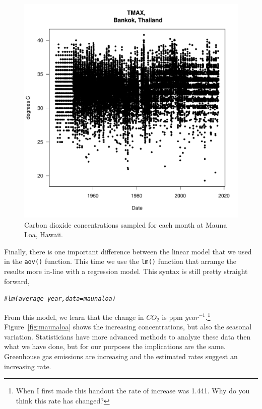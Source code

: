 \documentclass{article}\usepackage[]{graphicx}\usepackage[]{color}
\makeatletter
\def\maxwidth{ %
  \ifdim\Gin@nat@width>\linewidth
    \linewidth
  \else
    \Gin@nat@width
  \fi
}
\newcommand{\hlcom}[1]{\textcolor[rgb]{0.678,0.584,0.686}{\textit{#1}}}%
\newenvironment{kframe}{%
 \def\at@end@of@kframe{}%
 \ifinner\ifhmode%
  \def\at@end@of@kframe{\end{minipage}}%
  \begin{minipage}{\columnwidth}%
 \fi\fi%
 \def\FrameCommand##1{\hskip\@totalleftmargin \hskip-\fboxsep
 \colorbox{shadecolor}{##1}\hskip-\fboxsep
     \hskip-\linewidth \hskip-\@totalleftmargin \hskip\columnwidth}%
 \MakeFramed {\advance\hsize-\width
   \@totalleftmargin\z@ \linewidth\hsize
   \@setminipage}}%
 {\par\unskip\endMakeFramed%
 \at@end@of@kframe}
\newenvironment{knitrout}{}{} %
\makeatother
\begin{document}
\begin{figure}
\label{fig:test12}
\caption{Carbon dioxide concentrations sampled for each month at Mauna Loa, Hawaii.}
\begin{knitrout}
\color{fgcolor}
\includegraphics[width=\maxwidth]{figure/unnamed-chunk-15-1} 

\end{knitrout}
\end{figure}


Finally, there is one important difference between the linear model that we used in the \texttt{aov()} function. This time we use the \texttt{lm()} function that arrange the results more in-line with a regression model.
This syntax is still pretty straight forward,  

\begin{knitrout}
\color{fgcolor}\begin{kframe}
\begin{alltt}
\hlcom{#lm(average ~ year, data=maunaloa)}
\end{alltt}
\end{kframe}
\end{knitrout}

From this model, we learn that the change in $CO_2$ is 
ppm $year^{-1}$.\footnote{When I first made this handout the rate of increase was 1.441. Why do you think this rate has changed?} Figure~\ref{fig:maunaloa} shows the increasing concentrations, but also the seasonal variation. Statisticians have more advanced methods to analyze these data then what we have done, but for our purposes the implications are the same.  Greenhouse gas emissions are increasing and the estimated rates suggest an increasing rate.
\end{document}
